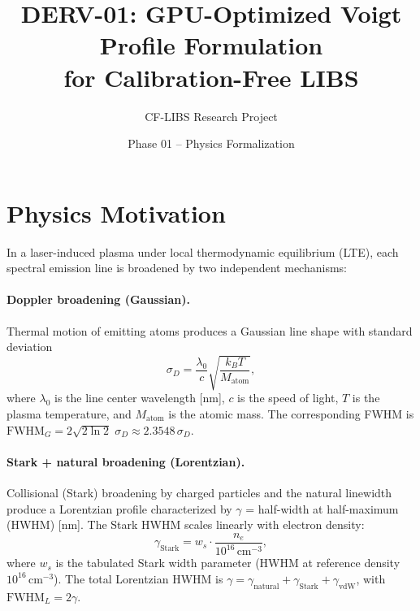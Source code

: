 \documentclass[11pt]{article}
\title{DERV-01: GPU-Optimized Voigt Profile Formulation\\
       for Calibration-Free LIBS}
\author{CF-LIBS Research Project}
\date{Phase 01 -- Physics Formalization}
\begin{document}
\maketitle

\section{Physics Motivation}
\label{sec:motivation}

In a laser-induced plasma under local thermodynamic equilibrium (LTE),
each spectral emission line is broadened by two independent mechanisms:

\paragraph{Doppler broadening (Gaussian).}
Thermal motion of emitting atoms produces a Gaussian line shape with
standard deviation
\begin{equation}
  \sigma_D = \frac{\lambda_0}{c}\sqrt{\frac{k_B T}{M_{\text{atom}}}},
  \label{eq:sigma_doppler}
\end{equation}
where $\lambda_0$ is the line center wavelength [nm], $c$ is the speed of light,
$T$ is the plasma temperature, and $M_{\text{atom}}$ is the atomic mass.
The corresponding FWHM is $\text{FWHM}_G = 2\sqrt{2\ln 2}\;\sigma_D \approx 2.3548\,\sigma_D$.

\paragraph{Stark + natural broadening (Lorentzian).}
Collisional (Stark) broadening by charged particles and the natural linewidth
produce a Lorentzian profile characterized by $\gamma$ = half-width at half-maximum (HWHM) [nm].
The Stark HWHM scales linearly with electron density:
\begin{equation}
  \gamma_{\text{Stark}} = w_s \cdot \frac{n_e}{10^{16}\,\text{cm}^{-3}},
  \label{eq:gamma_stark}
\end{equation}
where $w_s$ is the tabulated Stark width parameter (HWHM at reference density $10^{16}$\,cm$^{-3}$).
The total Lorentzian HWHM is $\gamma = \gamma_{\text{natural}} + \gamma_{\text{Stark}} + \gamma_{\text{vdW}}$,
with $\text{FWHM}_L = 2\gamma$.
\end{document}
